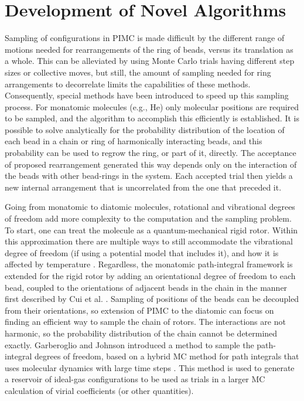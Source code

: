     \section{Development of Novel Algorithms}
    \label{sec:novel algorithms}
        Sampling of configurations in PIMC is made difficult by the different range of motions needed for rearrangements of the ring of beads, versus its translation as a whole. This can be alleviated by using Monte Carlo trials having different step sizes or collective moves, but still, the amount of sampling needed for ring arrangements to decorrelate limits the capabilities of these methods. Consequently, special methods have been introduced to speed up this sampling process. For monatomic molecules (e.g., He) only molecular positions are required to be sampled, and the algorithm \cite{Fosdick:1966vh,Patkowski2008,Shaul2012} to accomplish this efficiently is established. It is possible to solve analytically for the probability distribution of the location of each bead in a chain or ring of harmonically interacting beads, and this probability can be used to regrow the ring, or part of it, directly. The acceptance of proposed rearrangement generated this way depends only on the interaction of the beads with other bead-rings in the system. Each accepted trial then yields a new internal arrangement that is uncorrelated from the one that preceded it.

        Going from monatomic to diatomic molecules, rotational and vibrational degrees of freedom add more complexity to the computation and the sampling problem. To start, one can treat the molecule as a quantum-mechanical rigid rotor. Within this approximation there are multiple ways to still accommodate the vibrational degree of freedom (if using a potential model that includes it), and how it is affected by temperature \cite{Garberoglio2012,Garberoglio2014}. Regardless, the monatomic path-integral framework is extended for the rigid rotor by adding an orientational degree of freedom to each bead, coupled to the orientations of adjacent beads in the chain in the manner first described by Cui et al. \cite{Cui1997}. Sampling of positions of the beads can be decoupled from their orientations, so extension of PIMC to the diatomic can focus on finding an efficient way to sample the chain of rotors.  The interactions are not harmonic, so the probability distribution of the chain cannot be determined exactly. Garberoglio and Johnson \cite{Garberoglio2010} introduced a method to sample the path-integral degrees of freedom, based on a hybrid MC method for path integrals that uses molecular dynamics with large time steps \cite{Tuckerman:1993hu}.  This method is used to generate a reservoir of ideal-gas configurations to be used as trials in a larger MC calculation of virial coefficients (or other quantities).

